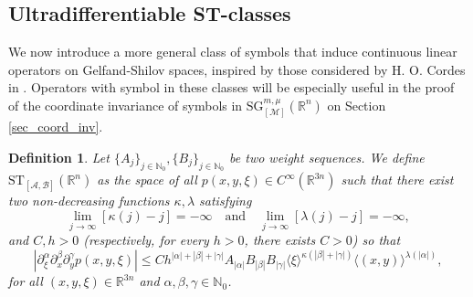 \documentclass[11pt,reqno]{amsart}
\numberwithin{equation}{section}
\newtheorem{definition}[theorem]{Definition}
\newcommand{\R}{{\mathbb{R}}} %
\newcommand{\SG}{{\mathrm{SG}}}
\newcommand{\ST}{{\mathrm{ST}}}
\newcommand{\Aj}{{\{A_j\}_{j\in\mathbb{N}_0}}} %
\newcommand{\Bj}{{\{B_j\}_{j\in\mathbb{N}_0}}} %
\newcommand{\M}{{\mathcal{M}}} %
\newcommand{\A}{{\mathcal{A}}} %
\newcommand{\B}{{\mathcal{B}}} %
\begin{document}

\subsection{Ultradifferentiable ST-classes}\label{subs:STclasses}
We now introduce a more general class of symbols that induce continuous linear operators on Gelfand-Shilov spaces, inspired by those considered by H. O. Cordes in \cite[Ch. 1, \S 1.1]{cordes}. Operators with symbol in these classes will be especially useful in the proof of the coordinate invariance of symbols in $\SG_{[\M]}^{m,\mu}(\R^n)$ on Section \ref{sec_coord_inv}.

\begin{definition}\label{ST_class}
	Let $\Aj,\Bj$ be two weight sequences. We define $\ST_{[\A,\B]}(\mathbb{R}^n)$ as the space of all $p(x,y,\xi)\in C^\infty(\mathbb{R}^{3n})$ such that there exist two non-decreasing functions $\kappa,\lambda$ satisfying
	\[\lim_{j\to\infty}[\kappa(j)-j]=-\infty\quad\text{and}\quad \lim_{j\to\infty}[\lambda(j)-j]=-\infty,\]
	and $C,h>0$ (respectively, for every $h>0$, there exists $C>0$)
	so that
	\[ |\partial_\xi^\alpha\partial_x^\beta\partial_y^\gamma p(x,y,\xi)| \leq Ch^{|\alpha|+|\beta|+|\gamma|} A_{|\alpha|}B_{|\beta|}B_{|\gamma|} \langle \xi\rangle^{\kappa(|\beta|+|\gamma|)}\langle (x,y)\rangle^{\lambda(|\alpha|)},\]
	for all $(x,y,\xi)\in\mathbb{R}^{3n}$ and $\alpha,\beta,\gamma\in\mathbb{N}_0$.
\end{definition}
\end{document}
